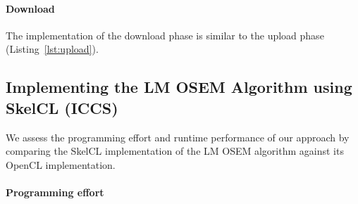 \paragraph{Download}
The implementation of the download phase is similar to the upload phase (Listing~\ref{lst:upload}).

\subsection{Implementing the LM OSEM Algorithm using SkelCL (ICCS)}
\label{sec:experiments}
\label{sec:experiments:skelcl}
We assess the programming effort and runtime performance of our approach by comparing the SkelCL implementation of the LM OSEM algorithm against its OpenCL implementation.

\paragraph{Programming effort}

